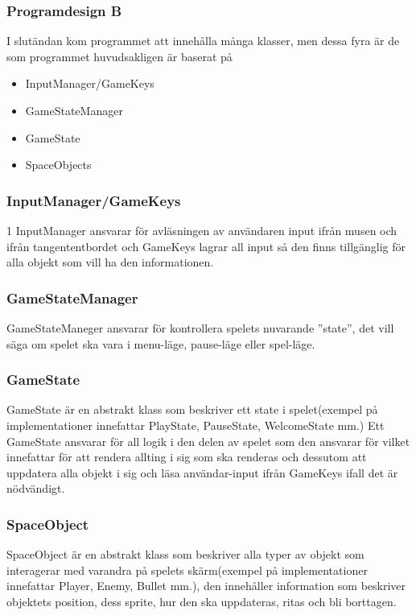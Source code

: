 \documentclass[a4paper,11pt]{article}
\begin{document}
\subsubsection{Programdesign B}

I slutändan kom programmet att innehålla många klasser, men dessa fyra är de som programmet huvudsakligen är baserat på
\begin{multicols}{2}
\begin{itemize}
\item InputManager/GameKeys
\item GameStateManager
\item GameState
\item SpaceObjects
\end{itemize}
\end{multicols}

\subsubsection{InputManager/GameKeys}
1 InputManager ansvarar för avläsningen av användaren input ifrån musen och ifrån tangententbordet och GameKeys lagrar all input så den finns tillgänglig för alla objekt som vill ha den informationen.

\subsubsection{GameStateManager}
GameStateManeger ansvarar för kontrollera spelets nuvarande ”state”, det vill säga om spelet ska vara i menu-läge, pause-läge eller spel-läge.

\subsubsection{GameState}
GameState är en abstrakt klass som beskriver ett state i spelet(exempel på implementationer innefattar PlayState, PauseState, WelcomeState mm.) Ett GameState ansvarar för all logik i den delen av spelet som den ansvarar för vilket innefattar för att rendera allting i sig som ska renderas och dessutom att uppdatera alla objekt i sig och läsa användar-input ifrån GameKeys ifall det är nödvändigt.

\subsubsection{SpaceObject}
SpaceObject är en abstrakt klass som beskriver alla typer av objekt som interagerar med varandra på spelets skärm(exempel på implementationer innefattar Player, Enemy, Bullet mm.), den innehåller information som beskriver objektets position, dess sprite, hur den ska  uppdateras, ritas och bli borttagen.
\end{document}
